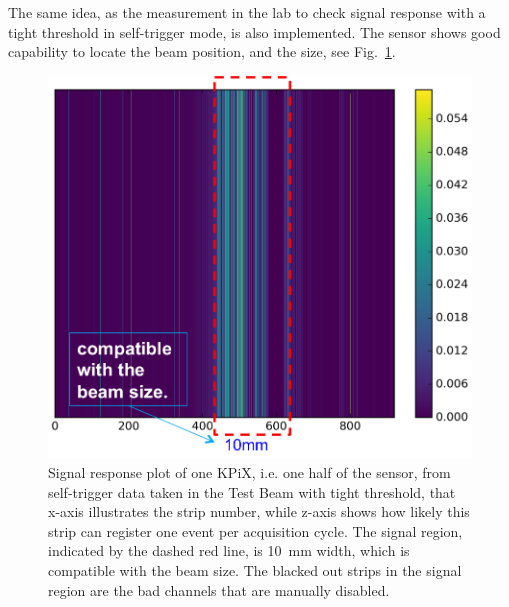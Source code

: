 \documentclass[conference]{IEEEtran}
\begin{document}
The same idea, as the measurement in the lab to check signal response with a tight threshold in self-trigger mode, is also implemented.
The sensor shows good capability to locate the beam position, and the size, see Fig.~\ref{fig:tb1}.
\begin{figure}[!ht]%
  \centering
  \includegraphics[width=0.75\linewidth]{pics/tb_1.png}
  \caption{Signal response plot of one KPiX, i.e. one half of the sensor, from self-trigger data taken in the Test Beam with tight threshold,
  that x-axis illustrates the strip number, while z-axis shows how likely this strip can register one event per acquisition cycle.
  The signal region, indicated by the dashed red line, is \SI{10}{mm} width, which is compatible with the beam size.
  The blacked out strips in the signal region are the bad channels that are manually disabled. }%
\label{fig:tb1}%
\end{figure}
\end{document}
